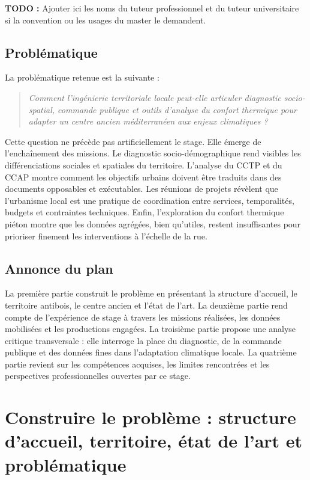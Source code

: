 \documentclass[11pt,a4paper]{report}
\newcommand{\todo}[1]{\textcolor{todored}{\textbf{TODO :} #1}}
\begin{document}
\todo{Ajouter ici les noms du tuteur professionnel et du tuteur universitaire si la convention ou les usages du master le demandent.}

\section*{Problématique}

La problématique retenue est la suivante :

\begin{quote}
\emph{Comment l'ingénierie territoriale locale peut-elle articuler diagnostic socio-spatial, commande publique et outils d'analyse du confort thermique pour adapter un centre ancien méditerranéen aux enjeux climatiques ?}
\end{quote}

Cette question ne précède pas artificiellement le stage. Elle émerge de l'enchaînement des missions. Le diagnostic socio-démographique rend visibles les différenciations sociales et spatiales du territoire. L'analyse du CCTP et du CCAP montre comment les objectifs urbains doivent être traduits dans des documents opposables et exécutables. Les réunions de projets révèlent que l'urbanisme local est une pratique de coordination entre services, temporalités, budgets et contraintes techniques. Enfin, l'exploration du confort thermique piéton montre que les données agrégées, bien qu'utiles, restent insuffisantes pour prioriser finement les interventions à l'échelle de la rue.

\section*{Annonce du plan}

La première partie construit le problème en présentant la structure d'accueil, le territoire antibois, le centre ancien et l'état de l'art. La deuxième partie rend compte de l'expérience de stage à travers les missions réalisées, les données mobilisées et les productions engagées. La troisième partie propose une analyse critique transversale : elle interroge la place du diagnostic, de la commande publique et des données fines dans l'adaptation climatique locale. La quatrième partie revient sur les compétences acquises, les limites rencontrées et les perspectives professionnelles ouvertes par ce stage.

\chapter{Construire le problème : structure d'accueil, territoire, état de l'art et problématique}
\end{document}
